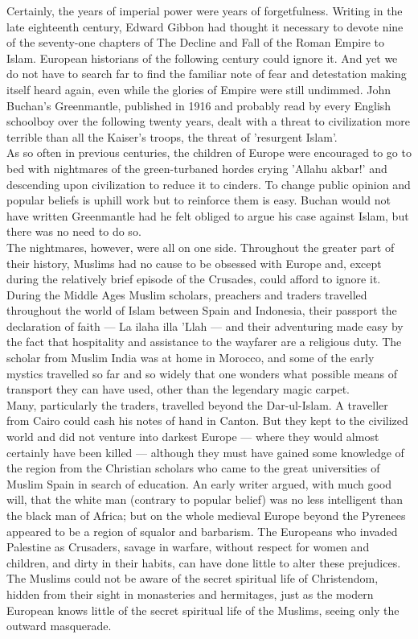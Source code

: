 \documentclass[10pt, twoside]{book}
\begin{document}
Certainly, the years of imperial power were years of forgetfulness. Writing in the late eighteenth century, Edward Gibbon had thought it necessary to devote nine of the seventy\hyp{}one chapters of The Decline and Fall of the Roman Empire to Islam. European historians of the following century could ignore it. And yet we do not have to search far to find the familiar note of fear and detestation making itself heard again, even while the glories of Empire were still undimmed. John Buchan's Greenmantle, published in 1916 and probably read by every English schoolboy over the following twenty years, dealt with a threat to civilization more terrible than all the Kaiser's troops, the threat of 'resurgent Islam'. \\

As so often in previous centuries, the children of Europe were encouraged to go to bed with nightmares of the green\hyp{}turbaned hordes crying 'Allahu akbar!' and descending upon civilization to reduce it to cinders. To change public opinion and popular beliefs is uphill work but to reinforce them is easy. Buchan would not have written Greenmantle had he felt obliged to argue his case against Islam, but there was no need to do so. \\

The nightmares, however, were all on one side. Throughout the greater part of their history, Muslims had no cause to be obsessed with Europe and, except during the relatively brief episode of the Crusades, could afford to ignore it. During the Middle Ages Muslim scholars, preachers and traders travelled throughout the world of Islam between Spain and Indonesia, their passport the declaration of faith --- La ilaha illa 'Llah --- and their adventuring made easy by the fact that hospitality and assistance to the wayfarer are a religious duty. The scholar from Muslim India was at home in Morocco, and some of the early mystics travelled so far and so widely that one wonders what possible means of transport they can have used, other than the legendary magic carpet. \\

Many, particularly the traders, travelled beyond the Dar\hyp{}ul\hyp{}Islam. A traveller from Cairo could cash his notes of hand in Canton. But they kept to the civilized world and did not venture into darkest Europe --- where they would almost certainly have been killed --- although they must have gained some knowledge of the region from the Christian scholars who came to the great universities of Muslim Spain in search of education. An early writer argued, with much good will, that the white man (contrary to popular belief) was no less intelligent than the black man of Africa; but on the whole medieval Europe beyond the Pyrenees appeared to be a region of squalor and barbarism. The Europeans who invaded Palestine as Crusaders, savage in warfare, without respect for women and children, and dirty in their habits, can have done little to alter these prejudices. The Muslims could not be aware of the secret spiritual life of Christendom, hidden from their sight in monasteries and hermitages, just as the modern European knows little of the secret spiritual life of the Muslims, seeing only the outward masquerade. \\
\end{document}
